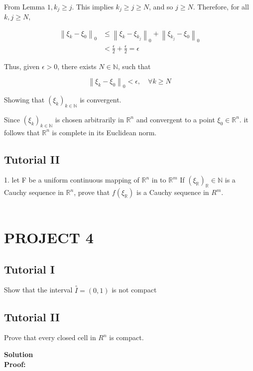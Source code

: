 \documentclass{article}
\begin{document}
From Lemma $1, k_{j} \geq j$. This implies $k_{j} \geq j \geq N$, and so $j \geq N$. Therefore, for all $k, j \geq N$,

$$
\begin{aligned}
\left\|\xi_{k}-\xi_{0}\right\|_{0} & \leq\left\|\xi_{k}-\xi_{k_{j}}\right\|_{0}+\left\|\xi_{k_{j}}-\xi_{0}\right\|_{0} \\
& <\frac{\epsilon}{2}+\frac{\epsilon}{2}=\epsilon
\end{aligned}
$$

Thus, given $\epsilon>0$, there exists $N \in \mathbb{N}$, such that

$$
\left\|\xi_{k}-\xi_{0}\right\|_{0}<\epsilon, \quad \forall k \geq N
$$
\begin{center}
Showing that $\left(\xi_{k}\right)_{k \in \mathbb{N}}$ is convergent. 
\end{center}

Since $\left(\xi_{k}\right)_{k \in \mathbb{N}}$ is chosen arbitrarily in $\mathbb{R}^{n}$ and convergent to a point $\xi_{0} \in \mathbb{R}^{n}$.
it follows that $\mathbb{R}^{n}$ is complete in its Euclidean norm.

\subsection{Tutorial II}

1. let F be a uniform continuous mapping of $\mathbb{R}^n$ in to $\mathbb{R}^m$ If $(\xi_{\mathbb{R}})_{\mathbb{R}}\in \mathbb{N}$ is a Cauchy sequence in $\mathbb{R}^n$, prove that  $f(\xi_{\mathbb{R}})$ is a Cauchy sequence in $R^m$.\\\\

\section{PROJECT 4}

\subsection{Tutorial I}
Show that the interval $\stackrel{\circ}{I}=(0,1)$ is not compact
\subsection{Tutorial II}
Prove that every closed cell in $R^n$ is compact.

\textbf{Solution}\\
\textbf{Proof:}
\end{document}
